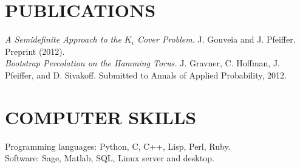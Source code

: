 \documentclass{res}
\begin{document}
\begin{resume}
\section{PUBLICATIONS}
{\em A Semidefinite Approach to the $K_i$ Cover Problem.} J. Gouveia and J. Pfeiffer. Preprint (2012).\\
{\em Bootstrap Percolation on the Hamming Torus.} J. Gravner, C. Hoffman, J. Pfeiffer, and D. Sivakoff. Submitted to Annals of Applied Probability, 2012.


\section{COMPUTER SKILLS}          
    Programming languages: Python, C, C++, Lisp, Perl, Ruby.\\
	Software: Sage, Matlab, SQL, Linux server and desktop.


 
 
  
 
\end{resume}
\end{document}
